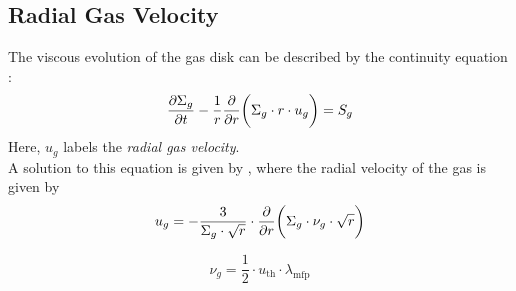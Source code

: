     \newpage\subsection{Radial Gas Velocity}


        The viscous evolution of the gas disk can be described by the continuity equation 
        \cite{birnstiel_dullemond_brauer_2010}:
        \begin{equation}
            \frac{\partial \Sigma_g}{\partial t}-\frac{1}{r}\frac{\partial }{\partial r}\bigg(\Sigma_g \cdot r \cdot u_g\bigg) = S_g
        \end{equation}
        Here, $u_g$ labels the \textit{radial gas velocity}.
        \\

        A solution to this equation is given by \cite{lynden-bell_pringle_1974}, where the 
        radial velocity of the gas is given by
        \begin{equation}
            u_{g}
            =-\frac{3}{\Sigma_g\cdot\sqrt{r}}
                \cdot\frac{\partial }{\partial r}\bigg(\Sigma_g \cdot \nu_g \cdot \sqrt{r}\bigg)
        \end{equation}

        \begin{equation}
            \nu_g = \frac{1}{2} \cdot u_\text{th} \cdot \lambda_\text{mfp}
        \end{equation}

        
